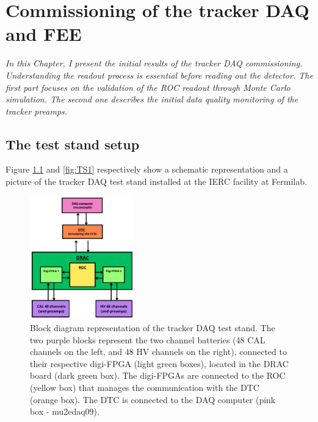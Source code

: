 \chapter{Commissioning of the tracker DAQ and FEE}\label{commissioning}
\textit{In this Chapter, I present the initial results of the tracker DAQ commissioning. 
Understanding the readout process is essential before reading out the detector. 
The first part focuses on the validation of the ROC readout through Monte Carlo simulation. 
The second one describes the initial data quality monitoring of the tracker preamps. 
}

  \section{The test stand setup}\label{des}
  Figure \ref{fig:blockdiagram} and \ref{fig:TS1} respectively show a 
  schematic representation and a picture of the tracker DAQ test stand 
  installed at the IERC facility at Fermilab.
  \begin{figure}[!h]
    \centering
    \includegraphics[width =0.4\textwidth]{figures/png/Screenshot_20240712_102528.png}
    \caption[Block diagram representation of the tracker DAQ test stand]{Block diagram representation of the tracker DAQ test stand. The two purple 
    blocks represent the two channel batteries (48 CAL channels on the left, 
    and 48 HV channels on the right), connected to their respective digi-FPGA 
    (light green boxes), located in the DRAC board (dark green box). The 
    digi-FPGAs are connected to the ROC (yellow box) that manages the communication with the
    DTC (orange box). The DTC is connected to the DAQ 
    computer (pink box - mu2edaq09).}
    \label{fig:blockdiagram}
    \end{figure}







